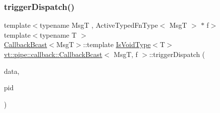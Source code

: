 \mbox{\label{structvt_1_1pipe_1_1callback_1_1_callback_bcast_aa5c6f297ec676eb2dda4d4b6238fa282}} 
\subsubsection{\texorpdfstring{trigger\+Dispatch()}{triggerDispatch()}\hspace{0.1cm}{\footnotesize\ttfamily [2/4]}}
{\footnotesize\ttfamily template$<$typename MsgT , Active\+Typed\+Fn\+Type$<$ Msg\+T $>$ $\ast$ f$>$ \\
template$<$typename T $>$ \\
\hyperlink{structvt_1_1pipe_1_1callback_1_1_callback_bcast}{Callback\+Bcast}$<$MsgT$>$\+::template \hyperlink{structvt_1_1pipe_1_1callback_1_1_callback_bcast_a3ca08c23824cfac76b837311a1d2c929}{Is\+Void\+Type}$<$T$>$ \hyperlink{structvt_1_1pipe_1_1callback_1_1_callback_bcast}{vt\+::pipe\+::callback\+::\+Callback\+Bcast}$<$ MsgT, f $>$\+::trigger\+Dispatch (\begin{DoxyParamCaption}\item[{\hyperlink{structvt_1_1pipe_1_1callback_1_1_callback_bcast_aaf994b71056001334d30d74fa9c958f9}{Signal\+Data\+Type} $\ast$}]{data,  }\item[{\hyperlink{namespacevt_ac9852acda74d1896f48f406cd72c7bd3}{Pipe\+Type} const \&}]{pid }\end{DoxyParamCaption})}

\mbox{\label{structvt_1_1pipe_1_1callback_1_1_callback_bcast_a6a0c65ef395baea684879a696e9fa8f1}} 
